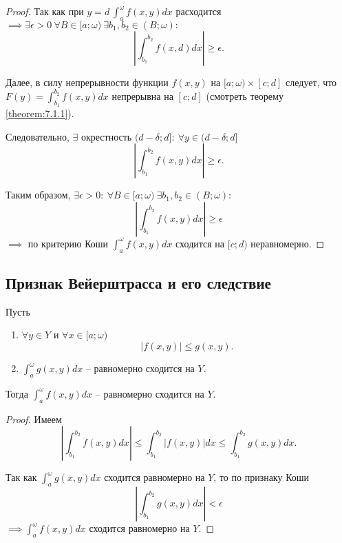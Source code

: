 \begin{proof}
    Так как при $y = d \ \int_{a}^{\omega}f(x,y)dx$ расходится $\implies \exists \epsilon > 0 \ \forall B \in [a;\omega) \ \exists b_1,b_2 \in (B;\omega):$
                \[
                    \left|\int_{b_1}^{b_2}f(x,d)dx\right| \geqslant \epsilon.
                \]

                Далее, в силу непрерывности функции $f(x,y)$ на $[a;\omega)\times [c;d]$ следует, что $F(y) = \int_{b_1}^{b_2}f(x,y)dx$ непрерывна на $[c;d]$ (смотреть теорему \ref{theorem:7.1.1}).

                        Следовательно, $\exists$ окрестность $(d - \delta;d]: \ \forall y \in (d - \delta;d]$
    \[
        \left|\int_{b_1}^{b_2}f(x,y)dx\right| \geqslant \epsilon.
    \]

    Таким образом, $\exists \epsilon > 0: \ \forall B \in [a;\omega) \ \exists b_1,b_2 \in (B;\omega):$
    \[
        \left|\int_{b_1}^{b_2}f(x,y)dx\right| \geqslant \epsilon
    \]
    $\implies$ по критерию Коши $\int_{a}^{\omega}f(x,y)dx$ сходится на $[c;d)$ неравномерно.
\end{proof}

\subsection{Признак Вейерштрасса и его следствие}

\begin{theorem}
    Пусть \begin{enumerate}
        \item $\forall y \in Y$ и $\forall x \in [a;\omega)$
              \[
                  \big|f(x,y)\big| \leqslant g(x,y).
              \]
        \item $\int_{a}^{\omega}g(x,y)dx$ -- равномерно сходится на $Y$.
    \end{enumerate}

    Тогда $\int_{a}^{\omega}f(x,y)dx$ -- равномерно сходится на $Y$.
\end{theorem}

\begin{proof}
    Имеем
    \[
        \left|\int_{b_1}^{b_2}f(x,y)dx\right| \leqslant \int_{b_1}^{b_2}\left|f(x,y)\right|dx \leqslant \int_{b_1}^{b_2}g(x,y)dx.
    \]

    Так как $\int_{a}^{\omega}g(x,y)dx$ сходится равномерно на $Y$, то по признаку Коши
    \[
        \left|\int_{b_1}^{b_2}g(x,y)dx\right| < \epsilon
    \]
    $\implies \int_{a}^{\omega}f(x,y)dx$ сходится равномерно на $Y$.
\end{proof}

